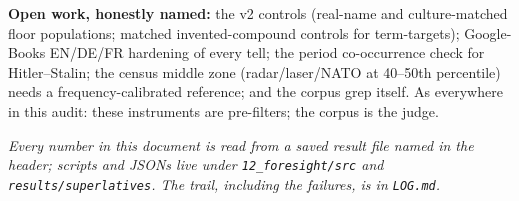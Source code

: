 \documentclass[11pt]{article}
\begin{document}
\noindent\textbf{Open work, honestly named:} the v2 controls (real-name and culture-matched floor
populations; matched invented-compound controls for term-targets); Google-Books EN/DE/FR hardening of
every tell; the period co-occurrence check for Hitler--Stalin; the census middle zone
(radar/laser/NATO at 40--50th percentile) needs a frequency-calibrated reference; and the corpus grep
itself. As everywhere in this audit: these instruments are pre-filters; the corpus is the judge.

\bigskip
\noindent\emph{Every number in this document is read from a saved result file named in the header;
scripts and JSONs live under \texttt{12\_foresight/src} and \texttt{results/superlatives}. The trail,
including the failures, is in \texttt{LOG.md}.}
\end{document}
